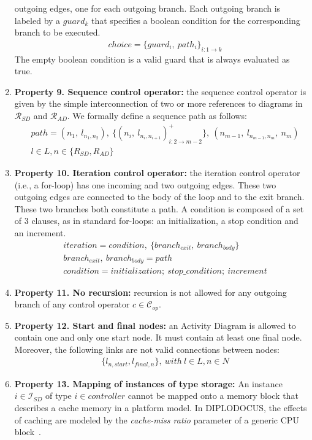 \documentclass{llncs}
\begin{document}
\begin{subappendices}
\begin{enumerate}
	outgoing edges, one for each outgoing branch. Each outgoing branch is labeled by a $guard_k$ that specifies a
	boolean condition for the corresponding branch to be executed.
		\begin{align*}
		&choice = \{guard_i,\ path_i\}_{i:1 \rightarrow k}
		\end{align*}
	The empty boolean condition is a valid guard that is always evaluated as true.
	\item \textbf{Property 9. Sequence control operator:} the sequence control operator is given by the simple
	interconnection of two or more references to diagrams in $\mathcal{R}_{SD}$ and $\mathcal{R}_{AD}$. We formally
	define a sequence path as follows:
		\begin{align*}
		&path = (n_1,\ l_{n_1,n_2}),\ \{(n_i,\ l_{n_i,n_{i+1}})^{+}_{i:2 \rightarrow m-2}\},\ (n_{m-1},\ l_{n_{m-1},n_{m}},\
		n_m)\\
		&l \in L, n \in \{R_{SD}, R_{AD}\}
		\end{align*}
	\item \textbf{Property 10. Iteration control operator:} the iteration control operator (i.e., a for-loop) has one
	incoming and two outgoing edges. These two outgoing edges are connected to the body of the loop and to the exit
	branch. These two branches both constitute a path. A condition is composed of a set of 3 clauses, as in standard
	for-loops: an initialization, a stop condition and an increment.
		\begin{align*}
		&iteration = condition,\ \{branch_{exit},\ branch_{body} \}\\
		&branch_{exit},\ branch_{body} = path\\
		&condition = initialization;\ stop\_condition;\ increment
		\end{align*}
	\item \textbf{Property 11. No recursion:} recursion is not allowed for any outgoing	branch of any control operator
	$c \in \mathcal{C}_{op}$.
	\item \textbf{Property 12. Start and final nodes:} an Activity Diagram is allowed to contain one and only one start
	node. It must contain at least one final node. Moreover, the following links are not valid connections between
	nodes:
		\begin{align*}
			&\{l_{n,start}, l_{final,n}\},\ with\ l \in L, n \in N
		\end{align*}
	\item \textbf{Property 13. Mapping of instances of type storage:} An instance $i \in \mathcal{I}_{SD}$ of type $i
	\in {controller}$ cannot be mapped onto a memory block that describes a cache memory in a platform model. In
	DIPLODOCUS, the effects of caching are modeled by the \textit{cache-miss ratio} parameter of a generic CPU
	block~\cite{Apvrille06,Apvrille08}.
\end{enumerate}
%
%
%
\newpage

\end{subappendices}
\end{document}
